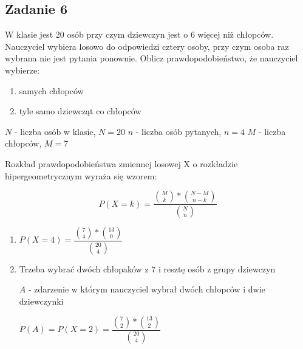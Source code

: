\subsection{Zadanie 6}

W klasie jest 20 osób przy czym dziewczyn jest o 6 więcej niż chłopców.
Nauczyciel wybiera losowo do odpowiedzi cztery osoby, przy czym osoba raz
wybrana nie jest pytania ponownie. Oblicz prawdopodobieństwo, że nauczyciel
wybierze:

\begin{enumerate}
\item samych chłopców
\item tyle samo dziewcząt co chłopców
\end{enumerate}

$N$ - liczba osób w klasie, $N = 20$
$n$ - liczba osób pytanych, $n = 4$
$M$ - liczba chłopców, $M = 7$

Rozkład prawdopodobieństwa zmiennej losowej X o rozkładzie hipergeometrycznym
wyraża się wzorem:

$$P(X=k) = \dfrac{\binom{M}{k} * \binom{N-M}{n-k}}{\binom{N}{n}}$$

\begin{enumerate}
\item
$P(X=4)= \dfrac{\binom{7}{4} * \binom{13}{0}}{\binom{20}{4}}$

\item
Trzeba wybrać dwóch chłopaków z 7 i resztę osób z grupy dziewczyn

$A$ - zdarzenie w którym nauczyciel wybrał dwóch chłopców i dwie dziewczynki

$P(A) = P(X=2)= \dfrac{\binom{7}{2} * \binom{13}{2}}{\binom{20}{4}}$
\end{enumerate}